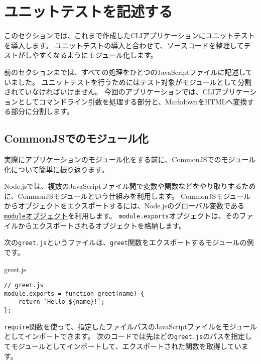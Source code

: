 \hypertarget{unit-test}{%
\section{ユニットテストを記述する}\label{unit-test}}

このセクションでは、これまで作成したCLIアプリケーションにユニットテストを導入します。
ユニットテストの導入と合わせて、ソースコードを整理してテストがしやすくなるようにモジュール化します。

前のセクションまでは、すべての処理をひとつのJavaScriptファイルに記述していました。
ユニットテストを行うためにはテスト対象がモジュールとして分割されていなければいけません。
今回のアプリケーションでは、CLIアプリケーションとしてコマンドライン引数を処理する部分と、MarkdownをHTMLへ変換する部分に分割します。

\hypertarget{commonjs-module}{%
\subsection{CommonJSでのモジュール化}\label{commonjs-module}}

実際にアプリケーションのモジュール化をする前に、CommonJSでのモジュール化について簡単に振り返ります。

Node.jsでは、複数のJavaScriptファイル間で変数や関数などをやり取りするために、CommonJSモジュールという仕組みを利用します。
CommonJSモジュールからオブジェクトをエクスポートするには、Node.jsのグローバル変数である\href{https://nodejs.org/api/modules.html\#modules_the_module_object}{\texttt{module}オブジェクト}を利用します。
\texttt{module.exports}オブジェクトは、そのファイルからエクスポートされるオブジェクトを格納します。

次の\texttt{greet.js}というファイルは、\texttt{greet}関数をエクスポートするモジュールの例です。

\begin{listtitle}
greet.js
\end{listtitle}
\begin{lstlisting}
// greet.js
module.exports = function greet(name) {
    return `Hello ${name}!`;
};
\end{lstlisting}
\listend

\texttt{require}関数を使って、指定したファイルパスのJavaScriptファイルをモジュールとしてインポートできます。
次のコードでは先ほどの\texttt{greet.js}のパスを指定してモジュールとしてインポートして、エクスポートされた関数を取得しています。

